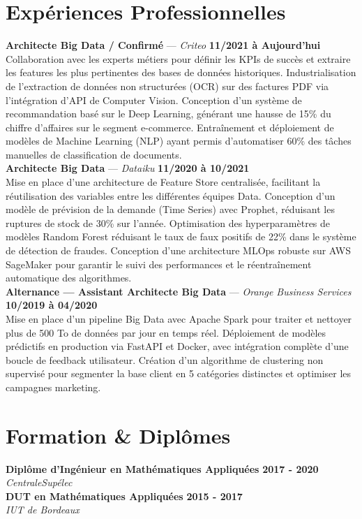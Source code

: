 \documentclass[11pt,a4paper]{article}
\begin{document}
\section*{Expériences Professionnelles}
\noindent \textbf{Architecte Big Data / Confirmé} --- \textit{Criteo} \hfill \textbf{11/2021 à Aujourd'hui} \\
Collaboration avec les experts métiers pour définir les KPIs de succès et extraire les features les plus pertinentes des bases de données historiques. Industrialisation de l'extraction de données non structurées (OCR) sur des factures PDF via l'intégration d'API de Computer Vision. Conception d'un système de recommandation basé sur le Deep Learning, générant une hausse de 15\% du chiffre d'affaires sur le segment e-commerce. Entraînement et déploiement de modèles de Machine Learning (NLP) ayant permis d'automatiser 60\% des tâches manuelles de classification de documents. \\[0.3cm]
\noindent \textbf{Architecte Big Data} --- \textit{Dataiku} \hfill \textbf{11/2020 à 10/2021} \\
Mise en place d'une architecture de Feature Store centralisée, facilitant la réutilisation des variables entre les différentes équipes Data. Conception d'un modèle de prévision de la demande (Time Series) avec Prophet, réduisant les ruptures de stock de 30\% sur l'année. Optimisation des hyperparamètres de modèles Random Forest réduisant le taux de faux positifs de 22\% dans le système de détection de fraudes. Conception d'une architecture MLOps robuste sur AWS SageMaker pour garantir le suivi des performances et le réentraînement automatique des algorithmes. \\[0.3cm]
\noindent \textbf{Alternance — Assistant Architecte Big Data} --- \textit{Orange Business Services} \hfill \textbf{10/2019 à 04/2020} \\
Mise en place d'un pipeline Big Data avec Apache Spark pour traiter et nettoyer plus de 500 To de données par jour en temps réel. Déploiement de modèles prédictifs en production via FastAPI et Docker, avec intégration complète d'une boucle de feedback utilisateur. Création d'un algorithme de clustering non supervisé pour segmenter la base client en 5 catégories distinctes et optimiser les campagnes marketing. \\[0.3cm]


\vspace{0.3cm}

\section*{Formation \& Diplômes}
\noindent \textbf{Diplôme d'Ingénieur en Mathématiques Appliquées} \hfill \textbf{2017 - 2020} \\
\textit{CentraleSupélec} \\[0.3cm]
\noindent \textbf{DUT en Mathématiques Appliquées} \hfill \textbf{2015 - 2017} \\
\textit{IUT de Bordeaux} \\[0.3cm]
\end{document}
